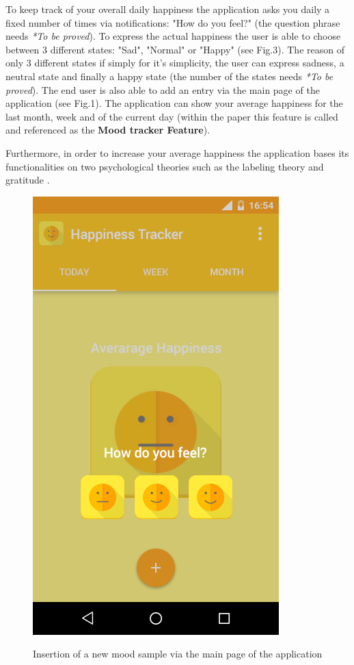 \documentclass[times]{jtitauth}
\begin{document}
To keep track of your overall daily happiness the application asks you daily a fixed
number of times via notifications: "How do you feel?" (the question phrase needs \textit{*To be proved}).
To express the actual happiness the user is able to choose between
3 different states: "Sad", "Normal" or "Happy" (see Fig.3).
The reason of only 3 different states if simply for it's simplicity, the user can express sadness,
a neutral state and finally a happy state (the number of the states needs \textit{*To be proved}).
The end user is also able to add an entry via the main page of the application (see Fig.1).
The application can show your average happiness for the last month, week and of the current day
(within the paper this feature is called and referenced as the \textbf{Mood tracker Feature}).

Furthermore, in order to increase your average happiness the application bases its functionalities
on two psychological theories such as the labeling theory \cite{3, 4, 5} and gratitude \cite{6, 7, 11}.

\begin{figure}[H]
\includegraphics[scale=0.23]{HappinessTracker-notifications}
\label{fig:notifications}
\centering
\caption{Insertion of a new mood sample via the main page of the application}
\end{figure}
\end{document}
